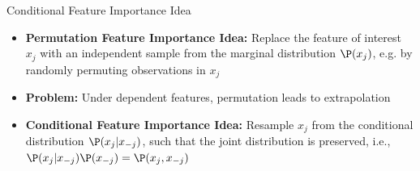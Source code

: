 \documentclass[11pt,compress,t,notes=noshow, aspectratio=169, xcolor=table]{beamer}
\begin{document}
\begin{frame}{Conditional Feature Importance Idea}

\begin{itemize}[<+->]
    \item \textbf{Permutation Feature Importance Idea:} Replace the feature of interest $x_j$ with an independent sample from the marginal distribution $\P(x_j)$, e.g. by randomly permuting observations in $x_j$
    \item \textbf{Problem:} Under dependent features, permutation leads to extrapolation
    \item \textbf{Conditional Feature Importance Idea:} Resample $x_j$ from the conditional distribution $\P(x_j|x_{-j})$, such that the joint distribution is preserved, i.e., $\P(x_j|x_{-j}) \P(x_{-j}) = \P(x_j, x_{-j})$
\end{itemize}
{}
\end{frame}
\end{document}
